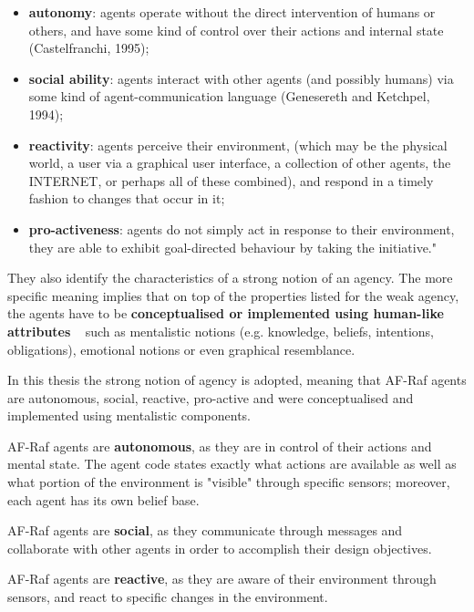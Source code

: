 \documentclass[a4paper,12pt,oneside,fleqn]{book} %
\newcommand{\todo}[1]{[\textcolor{red}{TODO}: #1]}
\begin{document}
\begin{itemize}
  \item \textbf{autonomy}: agents operate without the direct intervention
      of humans or others, and have some kind of control over their actions 
      and internal state (Castelfranchi, 1995);
    \item \textbf{social ability}: agents interact with other agents (and
      possibly humans) via some kind of agent-communication language
      (Genesereth and Ketchpel, 1994);
    \item \textbf{reactivity}: agents perceive their environment, (which may
      be the physical world, a user via a graphical user interface, a
      collection of other agents, the INTERNET, or perhaps all of these
      combined), and respond in a timely fashion to changes that occur in it;
    \item \textbf{pro-activeness}: agents do not simply act in response to
      their environment, they are able to exhibit goal-directed behaviour by
      taking the initiative."~\cite{DBLP:journals/ker/WooldridgeJ95}
\end{itemize}

They also identify the characteristics of a strong notion of an agency. The
more specific meaning implies that on top of the properties listed for the
weak agency, the agents have to be \textbf{conceptualised or implemented
using human-like attributes} ~\cite{DBLP:journals/ker/WooldridgeJ95} such
as mentalistic notions (e.g.  knowledge, beliefs, intentions, obligations),
emotional notions or even graphical resemblance.


In this thesis the strong notion of agency is adopted, meaning that AF-Raf
agents are autonomous, social, reactive, pro-active and were conceptualised
and implemented using mentalistic components.

AF-Raf agents are \textbf{autonomous}, as they are in control of their
actions and mental state. The agent code states exactly what actions are
available as well as what portion of the environment is "visible" through
specific sensors; moreover, each agent has its own belief base. 

AF-Raf agents are \textbf{social}, as they communicate through messages and
collaborate with other agents in order to accomplish their design
objectives. 

AF-Raf agents are \textbf{reactive}, as they are aware of their environment
through sensors, and react to specific changes in the environment.
\end{document}
